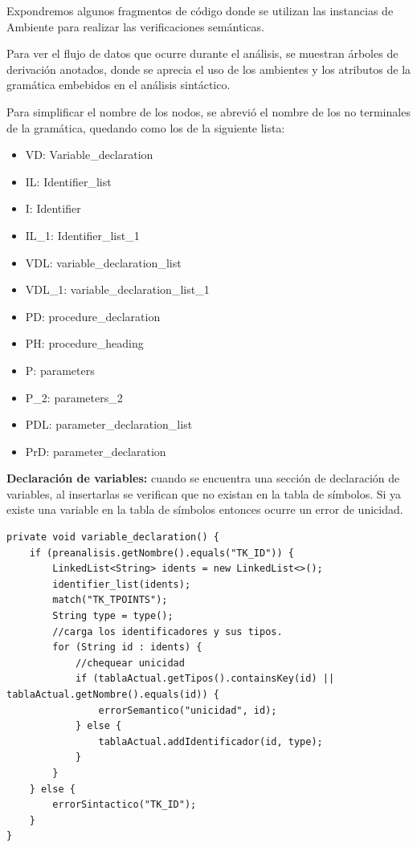 Expondremos algunos fragmentos de código donde se utilizan las instancias de Ambiente para realizar las verificaciones semánticas.

Para ver el flujo de datos que ocurre durante el análisis, se muestran árboles de derivación anotados, donde se aprecia el uso de los ambientes y los atributos de la gramática  embebidos en el análisis sintáctico.

Para simplificar el nombre de los nodos, se abrevió el nombre de los no terminales de la gramática, quedando como los de la siguiente lista:
\begin{itemize}
    \item VD: Variable\_declaration
    \item IL: Identifier\_list
    \item I: Identifier
    \item IL\_1: Identifier\_list\_1
    \item VDL: variable\_declaration\_list
    \item VDL\_1: variable\_declaration\_list\_1
    \item PD: procedure\_declaration
    \item PH: procedure\_heading
    \item P: parameters
    \item P\_2: parameters\_2
    \item PDL: parameter\_declaration\_list
    \item PrD: parameter\_declaration
\end{itemize}

\textbf{Declaración de variables:} cuando se encuentra una sección de declaración de variables, al insertarlas se verifican que no existan en la tabla de símbolos. Si ya existe una variable en la tabla de símbolos entonces ocurre un error de unicidad.

\begin{verbatim}
private void variable_declaration() {
	if (preanalisis.getNombre().equals("TK_ID")) {
		LinkedList<String> idents = new LinkedList<>();
		identifier_list(idents);
		match("TK_TPOINTS");
		String type = type();
		//carga los identificadores y sus tipos.
		for (String id : idents) {
			//chequear unicidad
			if (tablaActual.getTipos().containsKey(id) || tablaActual.getNombre().equals(id)) {
				errorSemantico("unicidad", id);
			} else {
				tablaActual.addIdentificador(id, type);
			}
		}
	} else {
		errorSintactico("TK_ID");
	}
}
\end{verbatim}


